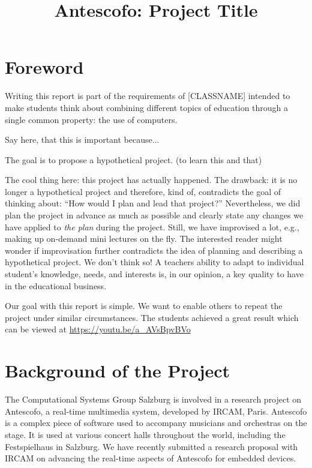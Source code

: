 \documentclass[onecolumn,nocopyrightspace,preprint]{sigplanconf}
\title{Antescofo: Project Title}
\begin{document}
\maketitle

\section{Foreword} 
Writing this report is part of the requirements of [CLASSNAME] intended to
make students think about combining different topics of education through
a single common property: the use of computers.


Say here, that this is important because...

The goal is to propose a hypothetical project. (to learn this and that)

The cool thing here: this project has actually happened. The drawback: it is
no longer a hypothetical project and therefore, kind of, contradicts the goal
of thinking about: ``How would I plan and lead that project?'' Nevertheless,
we did plan the project in advance as much as possible and clearly state any
changes we have applied  to \textit{the plan} during the project. Still, we
have improvised a lot, e.g., making up on-demand mini lectures on the fly. The
interested reader might wonder if improvisation further contradicts the idea
of planning and describing a hypothetical project.  We don't think so! A
teachers ability to adapt to individual student's knowledge, needs, and
interests is, in our opinion, a key quality to have in the educational
business.

Our goal with this report is simple. We want to enable others to repeat the
project under similar circumstances. The students achieved a great result
which can be viewed at \url{https://youtu.be/a_AVsBpvBVo}

\section{Background of the Project} 

The Computational Systems Group Salzburg is involved in a research
project on Antescofo, a real-time multimedia system, developed by IRCAM,
Paris. Antescofo is a complex piece of software used to accompany musicians
and orchestras on the stage. It is used at various concert halls throughout
the world, including the Festspielhaus in Salzburg. We have recently submitted
a research proposal with IRCAM on advancing the real-time aspects of Antescofo
for embedded devices.
\end{document}
